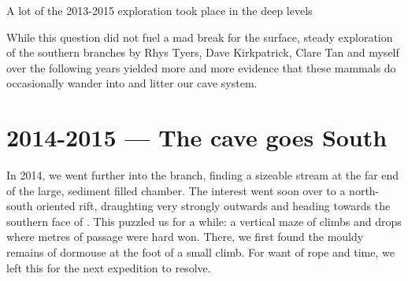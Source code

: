 \begin{marginfigure}
	\checkoddpage \ifoddpage \forcerectofloat \else \forceversofloat \fi
	\centering	{} 
  	\caption{A lot of the 2013-2015 exploration took place in the deep \protect{} levels }
	\end{marginfigure}


While this question did not fuel a mad break for the surface, steady exploration of the southern branches by Rhys Tyers, Dave Kirkpatrick, Clare Tan and myself over the following years yielded more and more evidence that these mammals do occasionally wander into and litter our cave system.

\section{2014-2015 --- The cave goes South}

In 2014, we went further into the  branch, finding a sizeable stream at the far end of the large, sediment filled  chamber. The interest went soon over to a north-south oriented rift, draughting very strongly outwards and heading towards the southern face of . This puzzled us for a while: a vertical maze of climbs and drops where metres of passage were hard won. There, we first found the mouldy remains of dormouse at the foot of a small climb. For want of rope and time, we left this for the next expedition to resolve.




